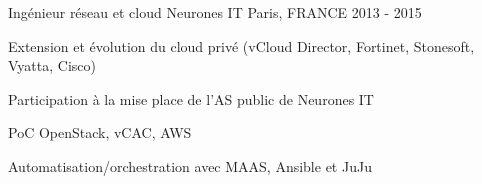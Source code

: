 \begin{cventries}
  \cventry
    {Ingénieur réseau et cloud}
    {Neurones IT} %
    {Paris, FRANCE} %
    {2013 - 2015} %
    {
      \begin{cvitems} %
      \item {Extension et évolution du cloud privé (vCloud Director, Fortinet, Stonesoft, Vyatta, Cisco)}
      \item {Participation à la mise place de l'AS public de Neurones IT}
        \item {PoC OpenStack, vCAC, AWS}
        \item {Automatisation/orchestration avec MAAS, Ansible et JuJu}
      \end{cvitems}
    }

\end{cventries}

